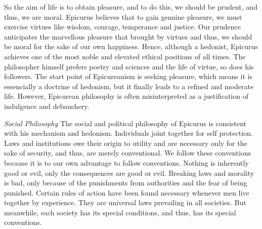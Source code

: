 \documentclass[11pt]{article}
\begin{document}
So the aim of life is to obtain pleasure, and to do this, we should be prudent, and thus, we are moral. 
Epicurus believes that to gain genuine pleasure, we must exercise virtues like wisdom, courage, temperance and justice. 
Our prudence anticipates the marvellous pleasure that brought by virtues and thus, we should be moral for the sake of our own happiness. 
Hence, although a hedonist, Epicurus achieves one of the most noble and elevated ethical positions of all times. 
The philosopher himself prefers poetry and sciences and the life of virtue, so does his followers. 
The start point of Epicureanism is seeking pleasure, which means it is essencially a doctrine of hedonism, but it finally leads to a refined and moderate life. 
However, Epicurean philosophy is often misinterpreted as a justification of indulgence and debauchery.

\textit{Social Philosophy}
The social and political philosophy of Epicurus is consistent with his mechanism and hedonism. 
Individuals joint together for self protection. 
Laws and institutions owe their origin to utility and are necessary only for the sake of security, and thus, are merely conventional. 
We follow these conventions because it is to our own advantage to follow conventions. 
Nothing is inherently good or evil, only the consequences are good or evil. 
Breaking laws and morality is bad, only because of the punishments from authorities and the fear of being punished. 
Certain rules of action have been found necessary whenever men live together by experience. 
They are universal laws prevailing in all societies. 
But meanwhile, each society has its special conditions, and thus, has its special conventions.
\end{document}

